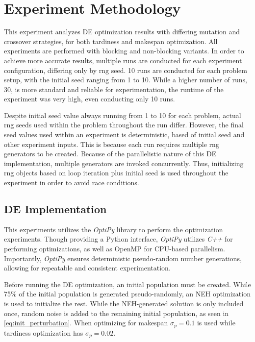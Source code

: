 \documentclass{article}
\begin{document}
\section{Experiment Methodology}

This experiment analyzes DE optimization results with differing mutation and crossover strategies, for both tardiness and makespan optimization. All experiments are performed with blocking and non-blocking variants. In order to achieve more accurate results, multiple runs are conducted for each experiment configuration, differing only by rng seed. 10 runs are conducted for each problem setup, with the initial seed ranging from 1 to 10. While a higher number of runs, 30, is more standard and reliable for experimentation, the runtime of the experiment was very high, even conducting only 10 runs. 

Despite initial seed value always running from 1 to 10 for each problem, actual rng seeds used within the problem throughout the run differ. However, the final seed values used within an experiment is deterministic, based of initial seed and other experiment inputs. This is because each run requires multiple rng generators to be created. Because of the parallelistic nature of this DE implementation, multiple generators are invoked concurrently. Thus, initializing rng objects based on loop iteration plus initial seed is used throughout the experiment in order to avoid race conditions.


\subsection{DE Implementation}

This experiments utilizes the \textit{OptiPy} library to perform the optimization experiments. Though providing a Python interface, \textit{OptiPy} utilizes \textit{C++} for performing optimizations, as well as OpenMP for CPU-based parallelism. Importantly, \textit{OptiPy} ensures deterministic pseudo-random number generations, allowing for repeatable and consistent experimentation.

Before running the DE optimization, an initial population must be created. While 75\% of the initial population is generated pseudo-randomly, an NEH optimization is used to initialize the rest. While the NEH-generated solution is only included once, random noise is added to the remaining initial population, as seen in \cref{eq:init_perturbation}. When optimizing for makespan $\sigma_p = 0.1$ is used while tardiness optimization has $\sigma_p = 0.02$. 
\end{document}
